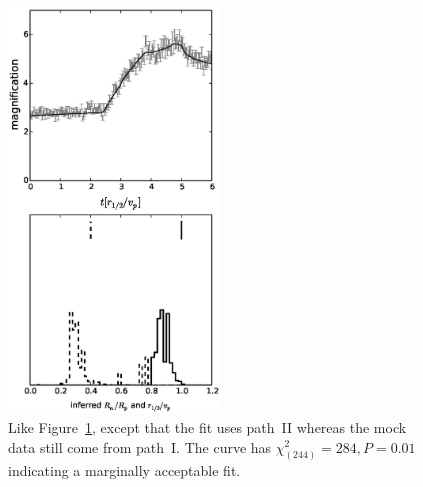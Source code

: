 \documentclass[usenatbib]{mn2e}
\begin{document}
\begin{figure}
\centering
  \includegraphics[width=0.5\textwidth]{figures/cc_backward.eps}
\caption{\label{fig:cc_backward} Like Figure~\ref{fig:cc_backward},
  except that the fit uses path~II whereas the mock data still come
  from path~I. The curve has $\chi^2_{(244)}=284, P=0.01$ indicating a
  marginally acceptable fit.}
\end{figure}
\end{document}
